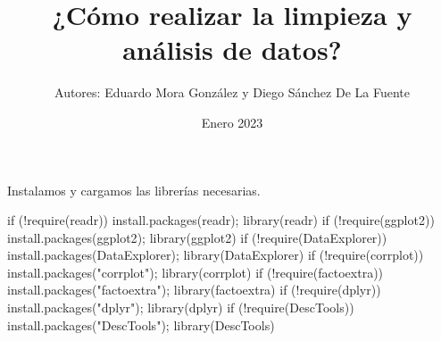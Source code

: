 \documentclass[
]{article}
\title{¿Cómo realizar la limpieza y análisis de datos?}
\author{Autores: Eduardo Mora González y Diego Sánchez De La Fuente}
\date{Enero 2023}
\newenvironment{Shaded}{\begin{snugshade}}{\end{snugshade}}
\newcommand{\ControlFlowTok}[1]{\textcolor[rgb]{0.94,0.87,0.69}{#1}}
\newcommand{\FunctionTok}[1]{\textcolor[rgb]{0.94,0.94,0.56}{#1}}
\newcommand{\NormalTok}[1]{\textcolor[rgb]{0.80,0.80,0.80}{#1}}
\newcommand{\SpecialCharTok}[1]{\textcolor[rgb]{0.86,0.64,0.64}{#1}}
\newcommand{\StringTok}[1]{\textcolor[rgb]{0.80,0.58,0.58}{#1}}
\begin{document}
\maketitle

{
\setcounter{tocdepth}{2}
\tableofcontents
}
Instalamos y cargamos las librerías necesarias.

\begin{Shaded}
\begin{Highlighting}[]
\ControlFlowTok{if}\NormalTok{ (}\SpecialCharTok{!}\FunctionTok{require}\NormalTok{(}\StringTok{\textquotesingle{}readr\textquotesingle{}}\NormalTok{)) }\FunctionTok{install.packages}\NormalTok{(}\StringTok{\textquotesingle{}readr\textquotesingle{}}\NormalTok{); }\FunctionTok{library}\NormalTok{(}\StringTok{\textquotesingle{}readr\textquotesingle{}}\NormalTok{)}
\ControlFlowTok{if}\NormalTok{ (}\SpecialCharTok{!}\FunctionTok{require}\NormalTok{(}\StringTok{\textquotesingle{}ggplot2\textquotesingle{}}\NormalTok{)) }\FunctionTok{install.packages}\NormalTok{(}\StringTok{\textquotesingle{}ggplot2\textquotesingle{}}\NormalTok{); }\FunctionTok{library}\NormalTok{(}\StringTok{\textquotesingle{}ggplot2\textquotesingle{}}\NormalTok{)}
\ControlFlowTok{if}\NormalTok{ (}\SpecialCharTok{!}\FunctionTok{require}\NormalTok{(}\StringTok{\textquotesingle{}DataExplorer\textquotesingle{}}\NormalTok{)) }\FunctionTok{install.packages}\NormalTok{(}\StringTok{\textquotesingle{}DataExplorer\textquotesingle{}}\NormalTok{); }\FunctionTok{library}\NormalTok{(}\StringTok{\textquotesingle{}DataExplorer\textquotesingle{}}\NormalTok{)}
\ControlFlowTok{if}\NormalTok{ (}\SpecialCharTok{!}\FunctionTok{require}\NormalTok{(}\StringTok{\textquotesingle{}corrplot\textquotesingle{}}\NormalTok{)) }\FunctionTok{install.packages}\NormalTok{(}\StringTok{"corrplot"}\NormalTok{); }\FunctionTok{library}\NormalTok{(corrplot)}
\ControlFlowTok{if}\NormalTok{ (}\SpecialCharTok{!}\FunctionTok{require}\NormalTok{(}\StringTok{\textquotesingle{}factoextra\textquotesingle{}}\NormalTok{)) }\FunctionTok{install.packages}\NormalTok{(}\StringTok{"factoextra"}\NormalTok{); }\FunctionTok{library}\NormalTok{(factoextra)}
\ControlFlowTok{if}\NormalTok{ (}\SpecialCharTok{!}\FunctionTok{require}\NormalTok{(}\StringTok{\textquotesingle{}dplyr\textquotesingle{}}\NormalTok{)) }\FunctionTok{install.packages}\NormalTok{(}\StringTok{"dplyr"}\NormalTok{); }\FunctionTok{library}\NormalTok{(dplyr)}
\ControlFlowTok{if}\NormalTok{ (}\SpecialCharTok{!}\FunctionTok{require}\NormalTok{(}\StringTok{\textquotesingle{}DescTools\textquotesingle{}}\NormalTok{)) }\FunctionTok{install.packages}\NormalTok{(}\StringTok{"DescTools"}\NormalTok{); }\FunctionTok{library}\NormalTok{(DescTools)}

\end{Highlighting}
\end{Shaded}
\end{document}
